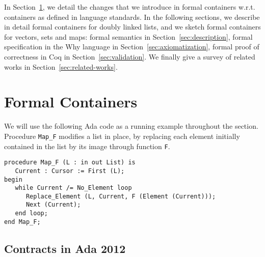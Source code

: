 \documentclass[runningheads,a4paper]{llncs}
\newcommand{\wrt}{w.r.t.\xspace}
\newcommand{\beforesec}{\vspace{-0.2cm}}
\newcommand{\aftersec}{\vspace{-0.2cm}}
\newcommand{\beforesub}{\vspace{-0.2cm}}
\newcommand{\aftersub}{\vspace{-0.1cm}}
\begin{document}
In Section~\ref{sec:formal-containers}, we detail the changes that we introduce
in formal containers \wrt containers as defined in language standards. In the following
sections, we describe in detail formal containers for doubly linked lists, and
we sketch formal containers for vectors, sets and maps: formal semantics in
Section~\ref{sec:description}, formal specification in the Why language in
Section~\ref{sec:axiomatization}, formal proof of correctness in Coq in
Section~\ref{sec:validation}. We finally give a survey of related works in
Section~\ref{sec:related-works}.


\beforesec
\section{Formal Containers}
\label{sec:formal-containers}
\aftersec

We will use the following Ada code as a running example throughout the
section. Procedure \verb|Map_F| modifies a list in place, by replacing each
element initially contained in the list by its image through function \verb|F|.

\begin{verbatim}
procedure Map_F (L : in out List) is
   Current : Cursor := First (L);
begin
   while Current /= No_Element loop
      Replace_Element (L, Current, F (Element (Current)));
      Next (Current);
   end loop;
end Map_F;
\end{verbatim}

\beforesub
\subsection{Contracts in Ada 2012}
\aftersub
\end{document}
